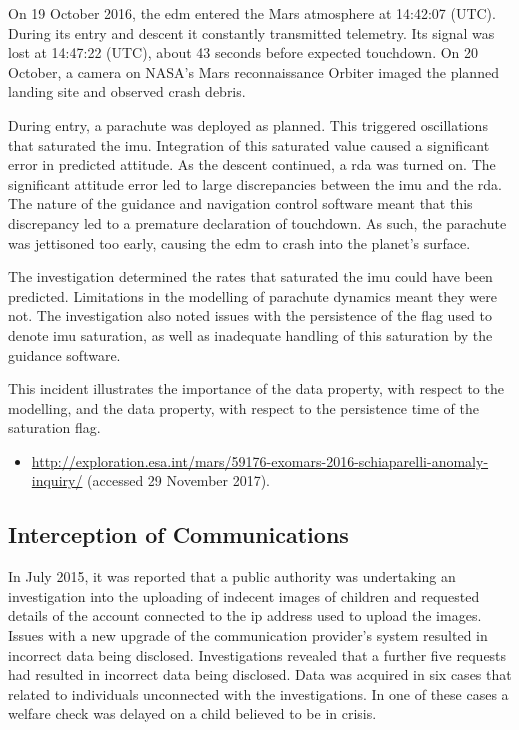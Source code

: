 On 19 October 2016, the \gls{edm} entered the Mars atmosphere at 14:42:07 (UTC). During its entry and descent it constantly transmitted telemetry. Its signal was lost at 14:47:22 (UTC), about 43 seconds before expected touchdown. On 20 October, a camera on NASA's Mars reconnaissance Orbiter imaged the planned landing site and observed crash debris.

During entry, a parachute was deployed as planned. This triggered oscillations that saturated the \gls{imu}. Integration of this saturated value caused a significant error in predicted attitude. As the descent continued, a \gls{rda} was turned on. The significant attitude error led to large discrepancies between the \gls{imu} and the \gls{rda}. The nature of the guidance and navigation control software meant that this discrepancy led to a premature declaration of touchdown. As such, the parachute was jettisoned too early, causing the \gls{edm} to crash into the planet's surface.

The investigation determined the rates that saturated the \gls{imu} could have been predicted. Limitations in the modelling of parachute dynamics meant they were not. The investigation also noted issues with the persistence of the flag used to denote \gls{imu} saturation, as well as inadequate handling of this saturation by the guidance software.

This incident illustrates the importance of the  \gls{data property}, with respect to the modelling, and the  \gls{data property}, with respect to the persistence time of the saturation flag.

\begin{samepage}
\begin{itemize}
	\item \raggedright{\href{http://exploration.esa.int/mars/59176-exomars-2016-schiaparelli-anomaly-inquiry/}{http://exploration.esa.int/mars/59176-exomars-2016-schiaparelli-anomaly-inquiry/} (accessed 29 November 2017).}
\end{itemize}
\end{samepage}


\subsection{Interception of Communications} \label{bkm:incacc:comintercept}
In July 2015, it was reported that a public authority was undertaking an investigation into the uploading of indecent images of children and requested details of the account connected to the \gls{ip} address used to upload the images. Issues with a new upgrade of the communication provider's system resulted in incorrect data being disclosed. Investigations revealed that a further five requests had resulted in incorrect data being disclosed. Data was acquired in six cases that related to individuals unconnected with the investigations. In one of these cases a welfare check was delayed on a child believed to be in crisis.

